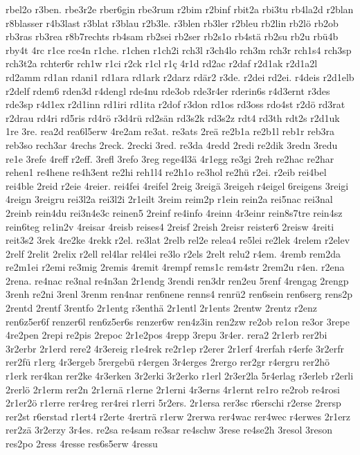 {rbel2o
r3ben.
rbe3r2e
rber6gin
rbe3rum
r2bim
r2binf
rbit2a
rbi3tu
rb4la2d
r2blan
r8blasser
r4b3last
r3blat
r3blau
r2b3le.
r3blen
rb3ler
r2bleu
rb2lin
rb2lö
rb2ob
rb3ras
rb3rea
r8b7rechts
rb4sam
rb2sei
rb2ser
rb2s1o
rb4stä
rb2su
rb2u
rbü4b
rby4t
4rc
r1ce
rce4n
r1che.
r1chen
r1ch2i
rch3l
r3ch4lo
rch3m
rch3r
rch1s4
rch3sp
rch3t2a
rchter6r
rch1w
r1ci
r2ck
r1cl
r1ç
4r1d
rd2ac
r2daf
r2d1ak
r2d1a2l
rd2amm
rd1an
rdani1
rd1ara
rd1ark
r2darz
rdär2
r3de.
r2dei
rd2ei.
r4deis
r2d1elb
r2delf
rdem6
rden3d
r4dengl
rde4nu
rde3ob
rde3r4er
rderin6s
r4d3ernt
r3des
rde3sp
r4d1ex
r2d1inn
rd1iri
rd1ita
r2dof
r3don
rd1os
rd3oss
rdo4st
r2dö
rd3rat
r2drau
rd4ri
rd5ris
rd4rö
r3d4rü
rd2sän
rd3s2k
rd3s2z
rdt4
rd3th
rdt2s
r2d1uk
1re
3re.
rea2d
rea6l5erw
4re2am
re3at.
re3ats
2reä
re2b1a
re2b1l
reb1r
reb3ra
reb3so
rech3ar
4rechs
2reck.
2recki
3red.
re3da
4redd
2redi
re2dik
3redn
3redu
re1e
3refe
4reff
r2eff.
3refl
3refo
3reg
rege4l3ä
4r1egg
re3gi
2reh
re2hac
re2har
rehen1
re4hene
re4h3ent
re2hi
reh1l4
re2h1o
re3hol
re2hü
r2ei.
r2eib
rei4bel
rei4ble
2reid
r2eie
4reier.
rei4fei
4reifel
2reig
3reigä
3reigeh
r4eigel
6reigens
3reigi
4reign
3reigru
rei3l2a
rei3l2i
2r1eilt
3reim
reim2p
r1ein
rein2a
rei5nac
rei3nal
2reinb
rein4du
rei3n4e3c
reinen5
2reinf
re4info
4reinn
4r3einr
rein8s7tre
rein4sz
rein6teg
re1in2v
4reisar
4reisb
reises4
2reisf
2reish
2reisr
reister6
2reisw
4reiti
reit3s2
3rek
4re2ke
4rekk
r2el.
re3lat
2relb
rel2e
relea4
re5lei
re2lek
4relem
r2elev
2relf
2relit
2relix
r2ell
rel4lar
rel4lei
re3lo
r2els
2relt
relu2
r4em.
4remb
rem2da
re2m1ei
r2emi
re3mig
2remis
4remit
4rempf
rems1c
rem4str
2rem2u
r4en.
r2ena
2rena.
re4nac
re3nal
re4n3an
2r1endg
3rendi
ren3dr
ren2eu
5renf
4rengag
2rengp
3renh
re2ni
3renl
3renm
ren4nar
ren6nene
renns4
renrü2
ren6sein
ren6serg
rens2p
2rentd
2rentf
3rentfo
2r1entg
r3enthä
2r1entl
2r1ents
2rentw
2rentz
r2enz
ren6z5er6f
renzer6l
ren6z5er6s
renzer6w
ren4z3in
ren2zw
re2ob
re1on
re3or
3repe
4re2pen
2repi
re2pis
2repoc
2r1e2pos
4repp
3repu
3r4er.
rera2
2r1erb
rer2bi
3r2erbr
2r1erd
rere2
4r3ereig
r1e4rek
re2r1ep
r2erer
2r1erf
4rerfah
r4erfe
3r2erfr
rer2fü
r1erg
4r3ergeb
5rergebü
r4ergen
3r4erges
2rergo
rer2gr
r4ergru
rer2hö
r1erk
rer4kan
rer2ke
4r3erken
3r2erki
3r2erko
r1erl
2r3er2la
5r4erlag
r3erleb
r2erli
2rerlö
2r1erm
rer2n
2r1ernä
r1erne
2r1erni
4r3erns
4r1ernt
re1ro
re2rob
re4rosi
2r1er2ö
r1erre
rer4reg
rer4rei
r1erri
5r2ers.
2r1ersa
rer3sc
r6erschi
r2erse
2rersp
rer2st
r6erstad
r1ert4
r2erte
4rerträ
r1erw
2rerwa
rer4wac
rer4wec
r4erwes
2r1erz
rer2zä
3r2erzy
3r4es.
re2sa
re4sam
re3sar
re4schw
3rese
re4se2h
3resol
3reson
res2po
2ress
4resse
res6s5erw
4ressu
}
